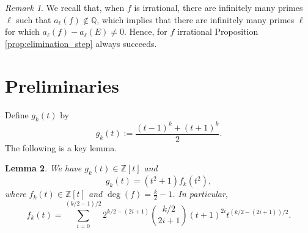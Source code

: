 \documentclass[12pt]{amsart}
\numberwithin{equation}{section}
\newtheorem{lemma}{Lemma}[section]
\theoremstyle{definition}
\theoremstyle{remark}
\newtheorem{remark}[lemma]{Remark}
\newcommand{\ZZ}{\mathbb{Z}}
\newcommand{\QQ}{\mathbb{Q}}
\begin{document}
\begin{remark}
We recall that, when $f$ is irrational, there are infinitely many primes $\ell$ 
such that $a_{\ell}(f)\not\in\QQ$, which implies that there are infinitely 
many primes $\ell$ for which $a_\ell(f)- a_\ell(E)\neq 0$. Hence, for $f$ 
irrational Proposition \ref{prop:elimination_step} always succeeds.
\end{remark}



\section{Preliminaries}\label{sec:preliminaries}

Define $g_k(t)$ by
\begin{equation}\label{eq:gk}
    g_k(t):=\frac{(t-1)^k + (t+1)^k}{2}.
\end{equation}
%
The following is a key lemma.
%
\begin{lemma}\label{lem:quadratic_factor}
We have $g_k(t)\in\ZZ[t]$ and 
\begin{equation*}
    g_k(t) = (t^2 + 1)f_k(t^2),
\end{equation*}
where $f_k(t)\in\ZZ[t]$ and $\deg(f)=\frac{k}{2} - 1$. In particular,
\begin{equation}\label{eq:fk}
    f_k(t) = \sum_{i=0}^{(k/2-1)/2}2^{k/2-(2i+1)}
    \binom{k/2}{2i+1}(t+1)^{2i}t^{(k/2-(2i+1))/2}.
\end{equation}
\end{lemma}
\end{document}
